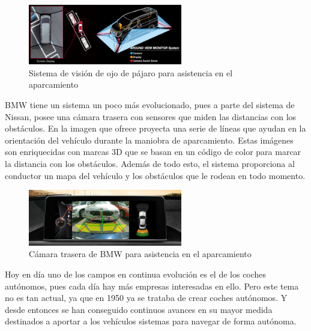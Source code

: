\begin{figure}[H]
  \begin{center}
    \includegraphics[width=0.6\textwidth]{figures/Introduccion/nissan.jpg}
		\caption{Sistema de visión de ojo de pájaro para asistencia en el aparcamiento}
		\label{fig.nissan}
		\end{center}
\end{figure}

BMW tiene un sistema un poco más evolucionado, pues  a parte del sistema de Nissan, posee una cámara trasera con sensores que miden las distancias con los obstáculos. En la imagen que ofrece proyecta una serie de líneas que ayudan en la orientación del vehículo durante la maniobra de aparcamiento. Estas imágenes son enriquecidas con marcas 3D que se basan en un código de color para marcar la distancia con los obstáculos. Además de todo esto, el sistema proporciona al conductor un mapa del vehículo y los obstáculos que le rodean en todo momento.

\begin{figure}[H]
  \begin{center}
    \includegraphics[width=0.6\textwidth]{figures/Introduccion/bmw.jpg}
		\caption{ Cámara trasera de BMW para asistencia en el aparcamiento}
		\label{fig.bmw}
		\end{center}
\end{figure}

Hoy en día uno de los campos en continua evolución es el de los coches autónomos, pues cada día hay más empresas interesadas en ello. Pero este tema no es tan actual, ya que en 1950 ya se trataba de crear coches autónomos. Y desde entonces se han conseguido continuos avances en su mayor medida destinados a aportar a los vehículos sistemas para navegar de forma autónoma.

